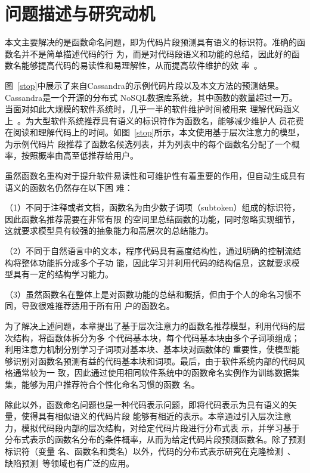 \section{问题描述与研究动机}\label{motivation3}
本文主要解决的是函数命名问题，即为代码片段预测具有语义的标识符。准确的函数名并不是简单描述代码的行
为，而是对代码段语义和功能的总结，因此好的函数名能够提高代码的易读性和易理解性，从而提高软件维护的效
率~\cite{takang1996effects}。

图~\ref{stop}中展示了来自Cassandra的示例代码片段以及本文方法的预测结果。Cassandra是一个开源的分布式
NoSQL数据库系统，其中函数的数量超过一万。当面对如此大规模的软件系统时，几乎一半的软件维护时间被用来
理解代码涵义上~\cite{corbi1989program}。为大型软件系统推荐具有语义的标识符作为函数名，能够减少维护人
员花费在阅读和理解代码上的时间。如图~\ref{stop}所示，本文使用基于层次注意力的模型，为示例代码片
段推荐了函数名候选列表，并为列表中的每个函数名分配了一个概率，按照概率由高至低推荐给用户。

虽然函数名重构对于提升软件易读性和可维护性有着重要的作用，但自动生成具有语义的函数名仍然存在以下困
难：

（1）不同于注释或者文档，函数名为由少数子词项（subtoken）组成的标识符，因此函数名推荐需要在非常有限
的空间里总结函数的功能，同时忽略实现细节，这就要求模型具有较强的抽象能力和高层次的总结能力。

（2）不同于自然语言中的文本，程序代码具有高度结构性，通过明确的控制流结构将整体功能拆分成多个子功
能，因此学习并利用代码的结构信息，这就要求模型具有一定的结构学习能力。

（3）虽然函数名在整体上是对函数功能的总结和概括，但由于个人的命名习惯不同，导致很难推荐适用于所有用
户的函数名。

为了解决上述问题，本章提出了基于层次注意力的函数名推荐模型，利用代码的层次结构，将函数体拆分为多
个代码基本块，每个代码基本块由多个子词项组成；利用注意力机制分别学习子词项对基本块、基本块对函数体的
重要性，使模型能够识别对函数名预测有益的代码基本块和词项。最后，由于软件系统内部的代码风格通常较为一
致，因此通过使用相同软件系统中的函数命名实例作为训练数据集集，能够为用户推荐符合个性化命名习惯的函数
名。

除此以外，函数命名问题也是一种代码表示问题，即将代码表示为具有语义的矢量，使得具有相似语义的代码片段
能够有相近的表示。本章通过引入层次注意力，模拟代码段内部的层次结构，对给定代码片段进行分布式表
示，并学习基于分布式表示的函数名分布的条件概率，从而为给定代码片段预测函数名。除了预测标识符（变量
名、函数名和类名）以外，代码的分布式表示研究在克隆检测~\cite{white2016deep,allamanis2018learning}、
缺陷预测~\cite{murali2017finding}等领域也有广泛的应用。

